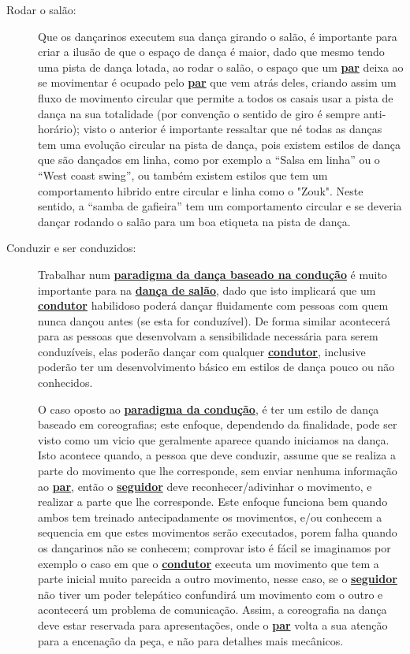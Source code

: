 \begin{description}

\item[Rodar o salão:] Que os dançarinos executem sua dança girando o salão, 
é importante para criar a ilusão de que o espaço de dança é maior, dado que mesmo
tendo uma pista de dança lotada, ao rodar o salão, o espaço que um
\hyperref[def:Par]{\textbf{par}} deixa ao se movimentar é ocupado pelo \hyperref[def:Par]{\textbf{par}} que vem atrás deles, criando 
assim um fluxo de movimento circular que permite a todos os casais usar a pista de dança
na sua totalidade (por convenção o sentido de giro é sempre anti-horário); 
visto o anterior é importante ressaltar que né todas as danças tem
uma evolução circular na pista de dança, pois existem estilos de dança que são dançados em linha,
como por exemplo a ``Salsa em linha'' ou o ``West coast swing'', ou também existem estilos que
tem um comportamento hibrido entre circular e linha como o "Zouk". Neste sentido,
a ``samba de gafieira'' tem um comportamento circular e se deveria dançar
rodando o salão para um boa etiqueta na pista de dança.


\item[Conduzir e ser conduzidos:] Trabalhar num \hyperref[def:ParadigmaConducao]{\textbf{paradigma da dança baseado
na condução}} é muito importante para na \hyperref[def:DancaSalao]{\textbf{dança de salão}}, dado que isto implicará
que um \hyperref[def:Condutor]{\textbf{condutor}} habilidoso poderá dançar fluidamente com pessoas com quem nunca dançou
antes (se esta for conduzível). De forma similar acontecerá para as pessoas que desenvolvam
a sensibilidade necessária para serem conduzíveis, elas poderão dançar com qualquer
\hyperref[def:Condutor]{\textbf{condutor}}, inclusive poderão ter um desenvolvimento básico em estilos de dança pouco ou não conhecidos.

O caso oposto ao \hyperref[def:ParadigmaConducao]{\textbf{paradigma da condução}}, é ter um estilo de dança baseado em coreografias;
este enfoque, dependendo da finalidade, pode ser visto como um vicio que geralmente aparece quando iniciamos
na dança. Isto acontece quando, a pessoa que deve conduzir, assume que se realiza a parte do movimento 
que lhe corresponde, sem enviar nenhuma informação ao \hyperref[def:Par]{\textbf{par}}, 
então o \hyperref[def:Seguidor]{\textbf{seguidor}} deve reconhecer/adivinhar o movimento, 
e realizar a parte que lhe corresponde. 
Este enfoque funciona bem quando ambos tem treinado antecipadamente os movimentos, 
e/ou conhecem a sequencia em que estes movimentos serão executados, 
porem falha quando os dançarinos não se conhecem;
comprovar isto é fácil se imaginamos por exemplo o caso em que o \hyperref[def:Condutor]{\textbf{condutor}} executa um movimento
que tem a parte inicial muito parecida a outro movimento, nesse caso, se o \hyperref[def:Seguidor]{\textbf{seguidor}} não tiver
um poder telepático confundirá um movimento com o outro e acontecerá um problema de comunicação. Assim, a coreografia
na dança deve estar reservada para apresentações, onde o \hyperref[def:Par]{\textbf{par}} volta 
a sua atenção para a encenação da peça, e não para detalhes mais mecânicos.


\end{description}
